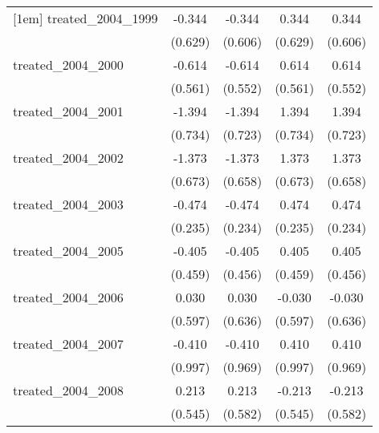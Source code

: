 {\begin{tabular}{l*{4}{c}}
[1em]
treated\_2004\_1999&      -0.344         &      -0.344         &       0.344         &       0.344         \\
            &     (0.629)         &     (0.606)         &     (0.629)         &     (0.606)         \\
[1em]
treated\_2004\_2000&      -0.614         &      -0.614         &       0.614         &       0.614         \\
            &     (0.561)         &     (0.552)         &     (0.561)         &     (0.552)         \\
[1em]
treated\_2004\_2001&      -1.394         &      -1.394         &       1.394         &       1.394         \\
            &     (0.734)         &     (0.723)         &     (0.734)         &     (0.723)         \\
[1em]
treated\_2004\_2002&      -1.373\sym{*}  &      -1.373\sym{*}  &       1.373\sym{*}  &       1.373\sym{*}  \\
            &     (0.673)         &     (0.658)         &     (0.673)         &     (0.658)         \\
[1em]
treated\_2004\_2003&      -0.474\sym{*}  &      -0.474\sym{*}  &       0.474\sym{*}  &       0.474\sym{*}  \\
            &     (0.235)         &     (0.234)         &     (0.235)         &     (0.234)         \\
[1em]
treated\_2004\_2005&      -0.405         &      -0.405         &       0.405         &       0.405         \\
            &     (0.459)         &     (0.456)         &     (0.459)         &     (0.456)         \\
[1em]
treated\_2004\_2006&       0.030         &       0.030         &      -0.030         &      -0.030         \\
            &     (0.597)         &     (0.636)         &     (0.597)         &     (0.636)         \\
[1em]
treated\_2004\_2007&      -0.410         &      -0.410         &       0.410         &       0.410         \\
            &     (0.997)         &     (0.969)         &     (0.997)         &     (0.969)         \\
[1em]
treated\_2004\_2008&       0.213         &       0.213         &      -0.213         &      -0.213         \\
            &     (0.545)         &     (0.582)         &     (0.545)         &     (0.582)         \\

\end{tabular}}
